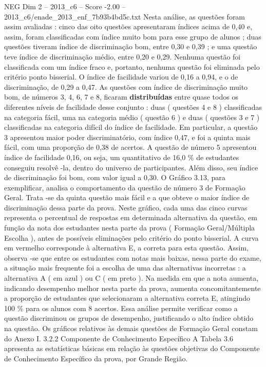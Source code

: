 \begin{textsample}{NEG Dim 2 – 2013\_c6 – Score -2.00 – 2013\_c6/enade\_2013\_enf\_7b93b4bd5c.txt}
Nesta análise, as questões foram assim avaliadas : cinco das oito questões apresentaram índices acima de 0,40 e, assim, foram classificadas com índice muito bom para esse grupo de alunos ; duas questões tiveram índice de discriminação bom, entre 0,30 e 0,39 ; e uma questão teve índice de discriminação médio, entre 0,20 e 0,29.
Nenhuma questão foi classificada com um índice fraco e, portanto, nenhuma questão foi eliminada pelo critério ponto bisserial.
O índice de facilidade variou de 0,16 a 0,94, e o de discriminação, de 0,29 a 0,47.
As questões com índice de discriminação muito bom, de números 3, 4, 6, 7 e 8, ficaram \textbf{distribuídas} entre quase todos os diferentes níveis de facilidade desse conjunto : duas ( questões 4 e 8 ) classificadas na categoria fácil, uma na categoria médio ( questão 6 ) e duas ( questões 3 e 7 ) classificadas na categoria difícil do índice de facilidade.
Em particular, a questão 3 apresentou maior poder discriminatório, com índice 0,47, e foi a quinta mais fácil, com uma proporção de 0,38 de acertos.
A questão de número 5 apresentou índice de facilidade 0,16, ou seja, um quantitativo de 16,0 \% de estudantes conseguiu resolvê -la, dentro do universo de participantes.
Além disso, seu índice de discriminação foi bom, com valor igual a 0,30.
O Gráfico 3.13, para exemplificar, analisa o comportamento da questão de número 3 de Formação Geral.
Trata -se da quinta questão mais fácil e a que obteve o maior índice de discriminação dessa parte da prova.
Neste gráfico, cada uma das cinco curvas representa o percentual de respostas em determinada alternativa da questão, em função da nota dos estudantes nesta parte da prova ( Formação Geral/Múltipla Escolha ), antes de possíveis eliminações pelo critério do ponto bisserial.
A curva em vermelho corresponde à alternativa E, a correta para esta questão.
Assim, observa -se que entre os estudantes com notas mais baixas, nessa parte do exame, a situação mais frequente foi a escolha de uma das alternativas incorretas : a alternativa A ( em azul ) ou C ( em preto ).
Na medida em que a nota aumenta, indicando desempenho melhor nesta parte da prova, aumenta concomitantemente a proporção de estudantes que selecionaram a alternativa correta E, atingindo 100 \% para os alunos com 8 acertos.
Essa análise permite verificar como a questão discriminou os grupos de desempenho, justificando o alto índice obtido na questão.
Os gráficos relativos às demais questões de Formação Geral constam do Anexo I. 3.2.2 Componente de Conhecimento Específico A Tabela 3.6 apresenta as estatísticas básicas em relação às questões objetivas do Componente de Conhecimento Específico da prova, por Grande Região.

\end{textsample}
